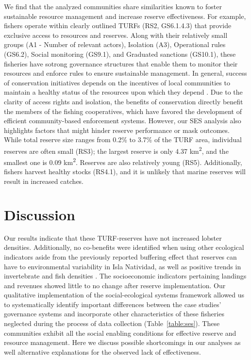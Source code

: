 \documentclass[10pt,letterpaper]{article}
\begin{document}
We find that the analyzed communities share similarities known to foster sustainable resource management and increase reserve effectiveness. For example, fishers operate within clearly outlined TURFs (RS2, GS6.1.4.3) that provide exclusive access to resources and reserves. Along with their relatively small groups (A1 - Number of relevant actors), Isolation (A3), Operational rules (GS6.2), Social monitoring (GS9.1), and Graduated sanctions (GS10.1), these fisheries have sotrong governance structures that enable them to monitor their resources and enforce rules to ensure sustainable management. In general, success of conservation initiatives depends on the incentives of local communities to maintain a healthy status of the resources upon which they depend \cite{jupiter_2017}. Due to the clarity of access rights and isolation, the benefits of conservation directly benefit the members of the fishing cooperatives, which have favored the development of efficient community-based enforcement systems. However, our SES analysis also highlights factors that might hinder reserve performance or mask outcomes. While total reserve size ranges from 0.2\% to 3.7\% of the TURF area, individual reserves are often small (RS3); the largest reserve is only 4.37 km\textsuperscript{2}, and the smallest one is 0.09 km\textsuperscript{2}. Reserves are also relatively young (RS5). Additionally, fishers harvest healthy stocks (RS4.1), and it is unlikely that marine reserves will result in increased catches.

\section*{Discussion}

Our results indicate that these TURF-reserves have not increased lobster densities. Additionally, no co-benefits were identified when using other ecological indicators aside from the previously reported buffering effect that reserves can have to environmental variability in Isla Natividad, as well as positive trends in invertebrate and fish densities \cite{micheli_2012-EU}. The socioeconomic indicators pertaining landings and revenues showed little to no change after reserve implementation. Our qualitative implementation of the social-ecological systems framework allowed us to systematically identify important differences between the case studies’ governance systems and incorporate other characteristics of these fisheries neglected during the process of data collection (Table~\ref{table:ses}). These communities exhibit all the social enabling conditions for effective reserve and resource management. Here we discuss possible shortcomings in our analyses as well alternative explanations for the observed lack of effectiveness.
\end{document}
